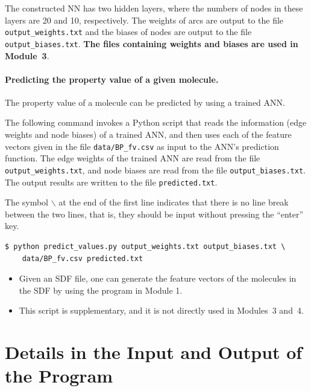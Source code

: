 \documentclass[11pt,titlepage,dvipdfmx,twoside]{book}
\begin{document}
The constructed NN has two hidden layers,
where the numbers of nodes in these layers
are 20 and 10, respectively.
The weights of arcs are output to the file \verb|output_weights.txt|
and the biases of nodes are output to the file
\verb|output_biases.txt|.  
%
{\bf The files containing weights and biases are used in Module~3}. 


\paragraph{Predicting the property value of a given molecule.}
The property value of a molecule can be predicted by using a trained ANN.

The following command invokes a Python  script that
reads the information (edge weights and node biases)
of a trained ANN, and then uses each of the feature vectors
given in the file \verb|data/BP_fv.csv| as input to the
ANN's prediction function.
The edge weights of the trained ANN are read from the file \verb|output_weights.txt|,
and node biases are read from the file \verb|output_biases.txt|.
The output results 
are written to the file \verb|predicted.txt|. 

\begin{oframed}
  {\small
\noindent The symbol $\backslash$ at the end of the first line indicates that there
is no line break between the two lines, that is, they should be input without 
pressing the ``enter'' key.
\begin{verbatim}
$ python predict_values.py output_weights.txt output_biases.txt \
    data/BP_fv.csv predicted.txt
\end{verbatim}
}
  \end{oframed}

\begin{itemize}
\item Given an SDF file,
  one can generate the feature vectors of the molecules in the SDF
  by using the program in Module 1.
\item This script is supplementary, and it is not directly used in Modules~3 and~4. 
\end{itemize}


\section{Details in the Input and Output of the Program}
\label{sec:io}
\end{document}
